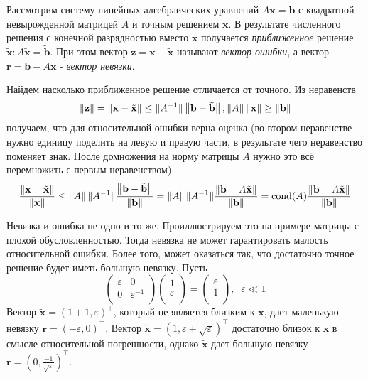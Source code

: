 Рассмотрим систему линейных алгебраических уравнений $A\mathbf{x} = \mathbf{b}$ с квадратной невырожденной матрицей $A$ и точным решением $\mathbf{x}$. В результате численного решения с конечной разрядностью вместо $\mathbf{x}$ получается \textit{приближенное} решение $\tilde{\mathbf{x}} : A\tilde{\mathbf{x}} = \tilde{\mathbf{b}}$. При этом вектор $\mathbf{z} = \mathbf{x} - \tilde{\mathbf{x}}$ называют \textit{вектор ошибки}, а вектор $\mathbf{r} = \mathbf{b} - A\tilde{\mathbf{x}}$ - \textit{вектор невязки}.

Найдем насколько приближенное решение отличается от точного. Из неравенств
$$
  \left\lVert\mathbf{z}\right\rVert = \left\lVert\mathbf{x} - \tilde{\mathbf{x}}\right\rVert \le \lVert A^{-1} \rVert \left\lVert\mathbf{b} - \tilde{\mathbf{b}}\right\rVert, \left\lVert A\right\rVert \left\lVert\mathbf{x}\right\rVert \ge \left\lVert\mathbf{b}\right\rVert
$$
получаем, что для относительной ошибки верна оценка (во втором неравенстве нужно единицу поделить на левую и правую части, в результате чего неравенство поменяет знак. После домножения на норму матрицы $A$ нужно это всё перемножить с первым неравенством)
$$
  \frac{\left\lVert\mathbf{x} - \tilde{\mathbf{x}}\right\rVert}{\left\lVert\mathbf{x}\right\rVert} \le \left\lVert A\right\rVert\lVert A^{-1} \rVert \frac{\left\lVert\mathbf{b} - \tilde{\mathbf{b}}\right\rVert}{\left\lVert\mathbf{b}\right\rVert} = \left\lVert A\right\rVert\lVert A^{-1} \rVert \frac{\left\lVert\mathbf{b} - A\tilde{\mathbf{x}}\right\rVert}{\left\lVert\mathbf{b}\right\rVert} = \operatorname{cond}(A) \frac{\left\lVert\mathbf{b} - A\tilde{\mathbf{x}}\right\rVert}{\left\lVert\mathbf{b}\right\rVert}
$$

\begin{example}
  Невязка и ошибка не одно и то же. Проиллюстрируем это на примере матрицы с плохой обусловленностью. Тогда невязка не может гарантировать малость относительной ошибки. Более того, может оказаться так, что достаточно точное решение будет иметь большую невязку. Пусть
  $$
    \begin{pmatrix}
      \varepsilon & 0                \\
      0           & \varepsilon^{-1} \\
    \end{pmatrix}
    \begin{pmatrix}
      1           \\
      \varepsilon \\
    \end{pmatrix}
    =
    \begin{pmatrix}
      \varepsilon \\
      1           \\
    \end{pmatrix}
    , \;\; \varepsilon \ll 1
  $$
  Вектор $\tilde{\mathbf{x}} = (1 + 1, \varepsilon)^\intercal$, который не является близким к $\mathbf{x}$, дает маленькую невязку $\mathbf{r} = (-\varepsilon, 0)^\intercal$. Вектор $\tilde{\mathbf{x}} = (1, \varepsilon + \sqrt{\varepsilon})^\intercal$ достаточно близок к $\mathbf{x}$ в смысле относительной погрешности, однако $\tilde{\mathbf{x}}$ дает большую невязку $\mathbf{r} = (0, \frac{-1}{\sqrt{\varepsilon}})^\intercal$.
\end{example}

